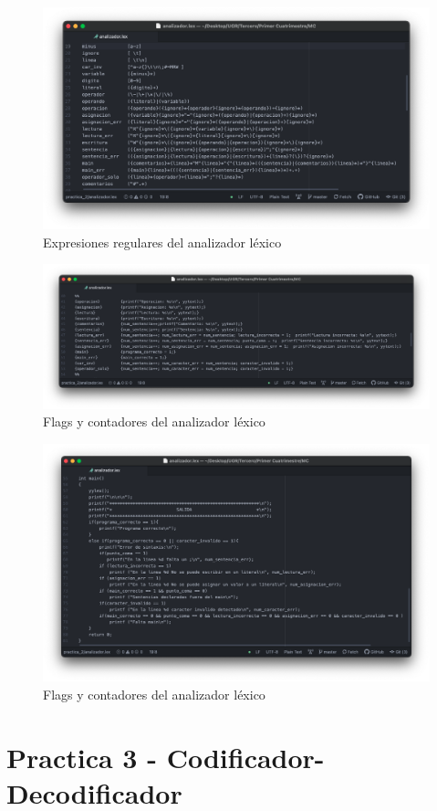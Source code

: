 \begin{figure}[H] 
	\centering
	\includegraphics[scale=0.425]{../practica_2/images/expresiones_regulares.png} 
	\caption{Expresiones regulares del analizador léxico} 
    \label{fig:expresiones_regulares}
\end{figure}

\begin{figure}[H] 
	\centering
	\includegraphics[scale=0.35]{../practica_2/images/acciones.png} 
	\caption{Flags y contadores del analizador léxico} 
    \label{fig:acciones}
\end{figure}

\begin{figure}[H] 
	\centering
	\includegraphics[scale=0.39]{../practica_2/images/funciones_c.png} 
	\caption{Flags y contadores del analizador léxico} 
    \label{fig:funciones_c}
\end{figure}

\newpage
\section{Practica 3 - Codificador-Decodificador}



